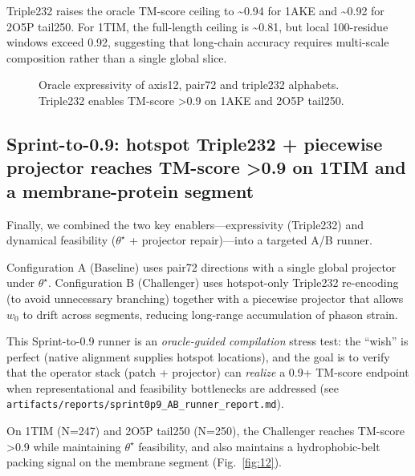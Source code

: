 Triple232 raises the oracle TM-score ceiling to \textasciitilde{}0.94 for 1AKE and \textasciitilde{}0.92 for 2O5P tail250. For 1TIM, the full-length ceiling is \textasciitilde{}0.81, but local 100-residue windows exceed 0.92, suggesting that long-chain accuracy requires multi-scale composition rather than a single global slice.

\begin{figure}[t]
  \centering
  \caption{Oracle expressivity of axis12, pair72 and triple232 alphabets. Triple232 enables TM-score >0.9 on 1AKE and 2O5P tail250.}
  \label{fig:8}
\end{figure}

\subsection{Sprint-to-0.9: hotspot Triple232 + piecewise projector reaches TM-score >0.9 on 1TIM and a membrane-protein segment}

Finally, we combined the two key enablers—expressivity (Triple232) and dynamical feasibility ($\theta^\star$ + projector repair)—into a targeted A/B runner.

Configuration A (Baseline) uses pair72 directions with a single global projector under $\theta^\star$. Configuration B (Challenger) uses hotspot-only Triple232 re-encoding (to avoid unnecessary branching) together with a piecewise projector that allows $w_0$ to drift across segments, reducing long-range accumulation of phason strain.

This Sprint-to-0.9 runner is an \emph{oracle-guided compilation} stress test: the ``wish'' is perfect (native alignment supplies hotspot locations), and the goal is to verify that the operator stack (patch + projector) can \emph{realize} a 0.9+ TM-score endpoint when representational and feasibility bottlenecks are addressed (see \texttt{artifacts/reports/sprint0p9\_AB\_runner\_report.md}).

On 1TIM (N=247) and 2O5P tail250 (N=250), the Challenger reaches TM-score >0.9 while maintaining $\theta^\star$ feasibility, and also maintains a hydrophobic-belt packing signal on the membrane segment (Fig.~\ref{fig:12}).

\begin{table}[t]
  \centering
  \caption{Sprint-to-0.9 A/B outcomes (baseline vs challenger).}
  \label{tab:3}
\end{table}

